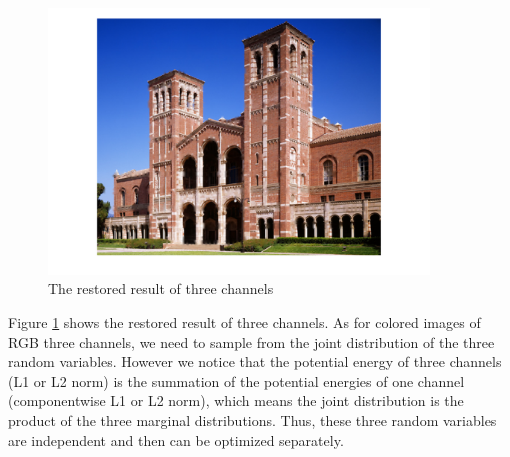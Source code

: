 \documentclass[11pt, oneside]{article}   	%
\begin{document}
\begin{figure}[H]
	\centering
	\includegraphics[width=0.9\textwidth]{plot4}
	\caption{The restored result of three channels}
	\label {fig:RGB}
\end{figure}
Figure \ref{fig:RGB} shows the restored result of three channels. As for colored images of RGB three channels, we need to sample from the joint distribution of the three random variables. However we notice that the potential energy of three channels (L1 or L2 norm) is the summation of the potential energies of one channel (componentwise L1 or L2 norm), which means the joint distribution is the product of the three marginal distributions. Thus, these three random variables are independent and then can be optimized separately. 
\end{document}
